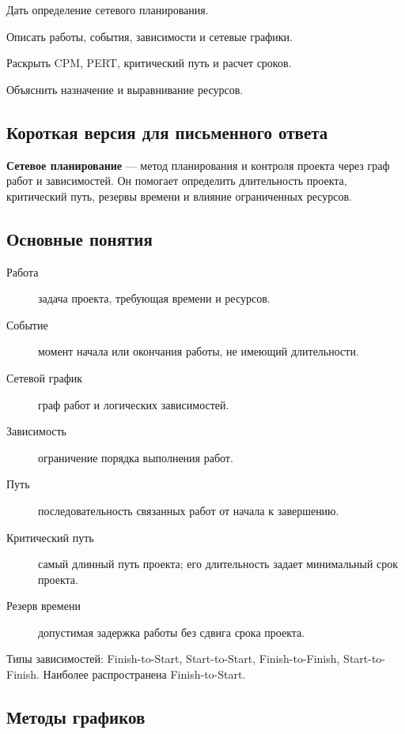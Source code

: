 
\begin{examplan}
    \item Дать определение сетевого планирования.
    \item Описать работы, события, зависимости и сетевые графики.
    \item Раскрыть CPM, PERT, критический путь и расчет сроков.
    \item Объяснить назначение и выравнивание ресурсов.
\end{examplan}

\subsection*{Короткая версия для письменного ответа}

\textbf{Сетевое планирование} --- метод планирования и контроля проекта через граф работ и зависимостей. Он помогает определить длительность проекта, критический путь, резервы времени и влияние ограниченных ресурсов.

\subsection*{Основные понятия}

\begin{description}
    \item[Работа] задача проекта, требующая времени и ресурсов.
    \item[Событие] момент начала или окончания работы, не имеющий длительности.
    \item[Сетевой график] граф работ и логических зависимостей.
    \item[Зависимость] ограничение порядка выполнения работ.
    \item[Путь] последовательность связанных работ от начала к завершению.
    \item[Критический путь] самый длинный путь проекта; его длительность задает минимальный срок проекта.
    \item[Резерв времени] допустимая задержка работы без сдвига срока проекта.
\end{description}

Типы зависимостей: Finish-to-Start, Start-to-Start, Finish-to-Finish, Start-to-Finish. Наиболее распространена Finish-to-Start.

\subsection*{Методы графиков}

